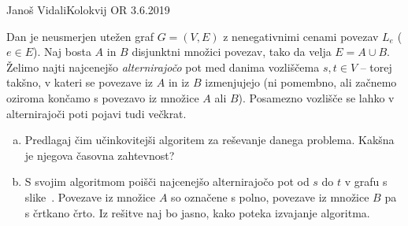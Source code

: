 \begin{naloga}{Janoš Vidali}{Kolokvij OR 3.6.2019}
\begin{vprasanje}
Dan je neusmerjen utežen graf $G = (V, E)$
z nenegativnimi cenami povezav $L_e$ ($e \in E$).
Naj bosta $A$ in $B$ disjunktni množici povezav, tako da velja $E = A \cup B$.
Želimo najti najcenejšo {\em alternirajočo} pot
med danima vozliščema $s, t \in V$
-- torej takšno, v kateri se povezave iz $A$ in iz $B$ izmenjujejo
(ni pomembno, ali začnemo oziroma končamo s povezavo iz množice $A$ ali $B$).
Posamezno vozlišče se lahko v alternirajoči poti pojavi tudi večkrat.

\begin{enumerate}[(a)]
\item Predlagaj čim učinkovitejši algoritem za reševanje danega problema.
Kakšna je njegova časovna zahtevnost?

\item S svojim algoritmom poišči najcenejšo alternirajočo pot od $s$ do $t$
v grafu s slike~\fig.
Povezave iz množice $A$ so označene s polno,
povezave iz množice $B$ pa s črtkano črto.
Iz rešitve naj bo jasno, kako poteka izvajanje algoritma.
\end{enumerate}
%
\begin{slika}
\makebox[\textwidth][c]{
\pgfslika
}
\end{slika}
\end{vprasanje}

\begin{odgovor}
\end{odgovor}
\end{naloga}
